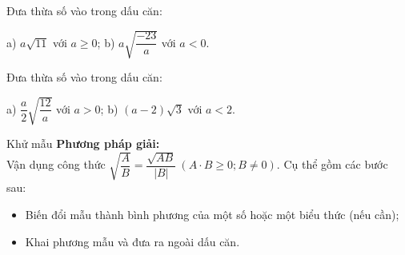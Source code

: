 \begin{vd}
Đưa thừa số vào trong dấu căn:

a) $a\sqrt{11}$ với $a\ge 0$;\hspace*{3cm} b) $a\sqrt{\dfrac{-23}{a}}$ với $a< 0$.
\end{vd}

\begin{vd}
Đưa thừa số vào trong dấu căn:

a) $\dfrac{a}{2}\sqrt{\dfrac{12}{a}}$ với $a> 0$;\hspace*{3cm} b) $(a-2)\sqrt{3}$ với $a<2$.
\end{vd}

\begin{dang}{Khử mẫu}
    \textbf{Phương pháp giải:}\\
    Vận dụng công thức $\sqrt{\dfrac{A}{B}}=\dfrac{\sqrt{AB}}{|B|}\ (A \cdot B \geq 0; B \neq 0).$ Cụ thể gồm các bước sau:
    \begin{itemize}
        \item Biến đổi mẫu thành bình phương của một số hoặc một biểu thức (nếu cần);
        \item Khai phương mẫu và đưa ra ngoài dấu căn.
    \end{itemize}
\end{dang}


